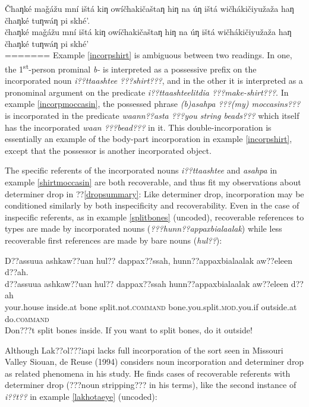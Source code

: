 \documentclass[output=paper]{LSP/langsci}
\begin{document}
\ea\label{lakhotaeye}
 	Čhaƞké maǧážu mní ištá kiƞ owíčhakičaštaƞ hiƞ na úƞ ištá wičhákičiyužaža haƞ čhaƞké tuƞwáƞ pi skhé’.\footnotemark\\
\gll	čhaƞké	maǧážu	mní	ištá	kiƞ	owíčhakičaštaƞ			hiƞ			na	úƞ			ištá		wičhákičiyužaža			haƞ			čhaƞké		tuƞwáƞ	pi		skhé’\\
=======
Example \ref{incorpshirt} is ambiguous between two readings. In one, the 1\textsuperscript{st}-person prominal \emph{b-} is interpreted as a possessive prefix on the incorporated noun  \emph{i??ttaashtee ???shirt???}, and in the other it is interpreted as a pronominal argument on the predicate \emph{i??ttaashteelitdia ???make-shirt???}. In example \ref{incorpmoccasin}, the possessed phrase \emph{(b)asahpa ???(my) moccasins???} is incorporated in the predicate \emph{waann??asta ???you string beads???} which itself has the incorporated \emph{waan ???bead???} in it. This double-incorporation is essentially an example of the body-part incorporation in example \ref{incorpshirt}, except that the possessor is another incorporated object.

	The specific referents of the incorporated nouns \emph{i??ttaashtee} and \emph{asahpa} in example \ref{shirtmoccasin} are both recoverable, and thus fit my observations about determiner drop in ??\ref{dropsummary}: Like determiner drop, incorporation may be conditioned similarly by both inspecificity and recoverability. Even in the case of inspecific referents, as in example \ref{splitbones} (uncoded), recoverable references to types are made by incorporated nouns (\emph{???hunn??appaxbialaalak}) while less recoverable first references are made by bare nouns (\emph{hul??}):
	 
\ea\label{splitbones}
 	D??assuua ashkaw??uan hul?? dappax??ssah, hunn??appaxbialaalak aw??eleen d??ah.\footnotemark\\
\gll	d??assuua		ashkaw??uan		hul??		dappax??ssah				hunn??appaxbialaalak			aw??eleen		d??ah\\
	your.house		inside.at		bone		split.not.\textsc{command}	bone.you.split.\textsc{mod}.you.if	outside.at		do.\textsc{command}\\
\glt	Don???t split bones inside. If you want to split bones, do it outside! 
\z

	Although Lak??ol???iapi lacks full incorporation of the sort seen in Missouri Valley Siouan, de Reuse (1994) considers noun incorporation and determiner drop as related phenomena in his study. He finds cases of recoverable referents with determiner drop (???noun stripping??? in his terms), like the second instance of \emph{i??t??} in example \ref{lakhotaeye} (uncoded):
	
\end{document}
